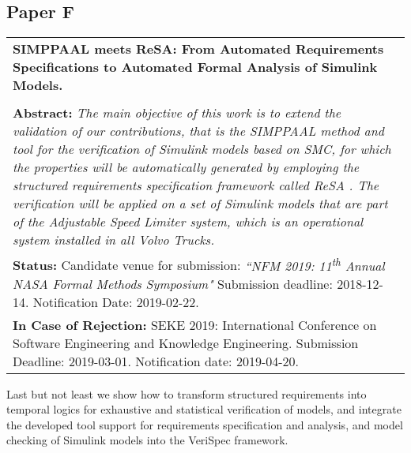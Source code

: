 \subsection{Paper F}
\begin{tabular}{p{\textwidth}}
\noindent \textbf{SIMPPAAL meets ReSA: From Automated Requirements Specifications to Automated Formal Analysis of Simulink Models.}\\%
\\[6pt]%
\noindent \textbf{Abstract:} \textit{The main objective of this work is to extend the validation of our contributions, that is the SIMPPAAL method and tool \cite{Filipovikj4714} for the verification of Simulink models based on SMC, for which the properties will be automatically generated by employing the structured requirements specification framework called ReSA \cite{resatool}. The verification will be applied on a set of Simulink models that are part of the Adjustable Speed Limiter system, which is an operational system installed in all Volvo Trucks.}\\[6pt]%
\textbf{Status: }Candidate venue for submission: \textit{``NFM 2019: 11\textsuperscript{th} Annual NASA Formal Methods Symposium"} Submission deadline: 2018-12-14. Notification Date: 2019-02-22.\\%
\textbf{In Case of Rejection: }SEKE 2019: International Conference on Software Engineering and Knowledge Engineering. Submission Deadline: 2019-03-01. Notification date: 2019-04-20.\\%
\end{tabular}

Last but not least we show how to transform structured requirements into temporal logics for exhaustive and statistical verification of models, and integrate the developed tool support for requirements specification and analysis, and model checking of Simulink models into the VeriSpec framework. 